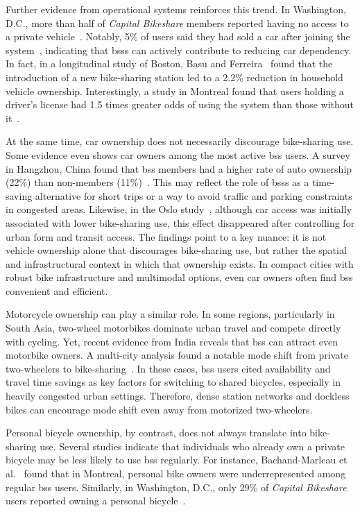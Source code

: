     Further evidence from operational systems reinforces this trend. In Washington, D.C., more than half of \textit{Capital Bikeshare} members reported having no access to a private vehicle~\cite{CapitalBikeshare2013}. Notably, 5\% of users said they had sold a car after joining the system~\cite{CapitalBikeshare2013}, indicating that \acp{bss} can actively contribute to reducing car dependency. In fact, in a longitudinal study of Boston, Basu and Ferreira~\cite{Basu2021} found that the introduction of a new bike-sharing station led to a 2.2\% reduction in household vehicle ownership. Interestingly, a study in Montreal found that users holding a driver’s license had 1.5 times greater odds of using the system than those without it~\cite{BachandMarleau2012}. 

    At the same time, car ownership does not necessarily discourage bike-sharing use. Some evidence even shows car owners among the most active \ac{bss} users. A survey in Hangzhou, China found that \ac{bss} members had a higher rate of auto ownership (22\%) than non-members (11\%)~\cite{Shaheen2011_worldwide}. This may reflect the role of \acp{bss} as a time-saving alternative for short trips or a way to avoid traffic and parking constraints in congested areas. Likewise, in the Oslo study~\cite{Mouratidis2022}, although car access was initially associated with lower bike-sharing use, this effect disappeared after controlling for urban form and transit access. The findings point to a key nuance: it is not vehicle ownership alone that discourages bike-sharing use, but rather the spatial and infrastructural context in which that ownership exists. In compact cities with robust bike infrastructure and multimodal options, even car owners often find \ac{bss} convenient and efficient.

    Motorcycle ownership can play a similar role. In some regions, particularly in South Asia, two-wheel motorbikes dominate urban travel and compete directly with cycling. Yet, recent evidence from India reveals that \ac{bss} can attract even motorbike owners. A multi-city analysis found a notable mode shift from private two-wheelers to bike-sharing~\cite{TUMI2023}. In these cases, \ac{bss} users cited availability and travel time savings as key factors for switching to shared bicycles, especially in heavily congested urban settings. Therefore, dense station networks and dockless bikes can encourage mode shift even away from motorized two-wheelers.

    Personal bicycle ownership, by contrast, does not always translate into bike-sharing use. Several studies indicate that individuals who already own a private bicycle may be less likely to use \ac{bss} regularly. For instance, Bachand-Marleau et al.~\cite{BachandMarleau2012} found that in Montreal, personal bike owners were underrepresented among regular \ac{bss} users. Similarly, in Washington, D.C., only 29\% of \textit{Capital Bikeshare} users reported owning a personal bicycle~\cite{Buck2013}.

